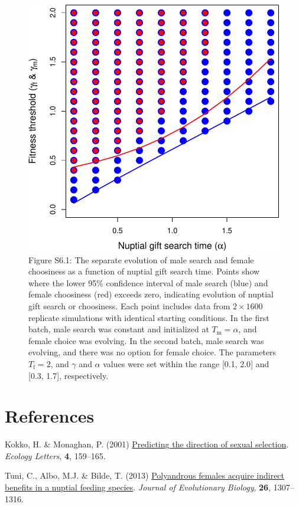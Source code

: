\documentclass[
]{article}
\newlength{\cslhangindent}
\newlength{\cslentryspacingunit} %
\newenvironment{CSLReferences}[2] %
 {%
  \setlength{\parindent}{0pt}
  \ifodd #1
  \let\oldpar\par
  \def\par{\hangindent=\cslhangindent\oldpar}
  \fi
  \setlength{\parskip}{#2\cslentryspacingunit}
 }%
 {}
\begin{document}
\begin{figure}
\centering
\includegraphics{SI_files/figure-latex/unnamed-chunk-12-1.pdf}
\caption{Figure S6.1: The separate evolution of male search and female
choosiness as a function of nuptial gift search time. Points show where
the lower 95\% confidence interval of male search (blue) and female
choosiness (red) exceeds zero, indicating evolution of nuptial gift
search or choosiness. Each point includes data from \(2 \times 1600\)
replicate simulations with identical starting conditions. In the first
batch, male search was constant and initialized at
\(T_{\mathrm{m}} = \alpha\), and female choice was evolving. In the
second batch, male search was evolving, and there was no option for
female choice. The parameters \(T_{\mathrm{f}}=2\), and \(\gamma\) and
\(\alpha\) values were set within the range {[}0.1, 2.0{]} and {[}0.3,
1.7{]}, respectively.}
\end{figure}

\captionsetup{labelformat=default}

\clearpage

\hypertarget{references}{%
\section*{References}\label{references}}

\hypertarget{refs}{}
\begin{CSLReferences}{0}{0}
\leavevmode{}%
Kokko, H. \& Monaghan, P. (2001)
\href{https://doi.org/10.1046/j.1461-0248.2001.00212.x}{{Predicting the
direction of sexual selection}}. \emph{Ecology Letters}, \textbf{4},
159--165.

\leavevmode{}%
Tuni, C., Albo, M.J. \& Bilde, T. (2013)
\href{https://doi.org/10.1111/jeb.12137}{{Polyandrous females acquire
indirect benefits in a nuptial feeding species}}. \emph{Journal of
Evolutionary Biology}, \textbf{26}, 1307--1316.

\end{CSLReferences}
\end{document}
